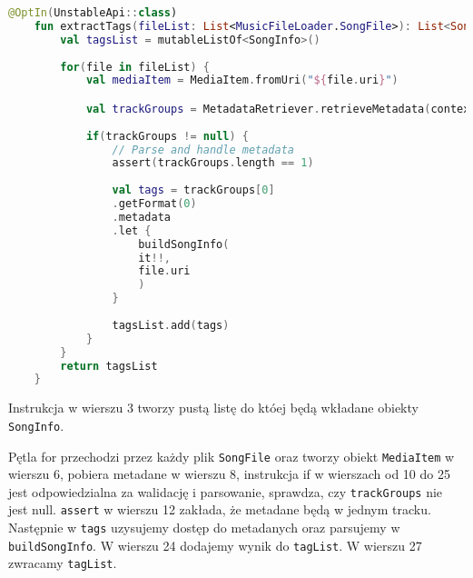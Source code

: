 \begin{lstlisting}[caption=Metoda \texttt{TagExtractor()}, label={lst:Tag-tagextractor}, language=kotlin]
	@OptIn(UnstableApi::class)
	fun extractTags(fileList: List<MusicFileLoader.SongFile>): List<SongInfo> {
		val tagsList = mutableListOf<SongInfo>()
		
		for(file in fileList) {
			val mediaItem = MediaItem.fromUri("${file.uri}")

			val trackGroups = MetadataRetriever.retrieveMetadata(context, mediaItem).get()
			
			if(trackGroups != null) {
				// Parse and handle metadata
				assert(trackGroups.length == 1)
				
				val tags = trackGroups[0]
				.getFormat(0)
				.metadata
				.let {
					buildSongInfo(
					it!!,
					file.uri
					)
				}
				
				tagsList.add(tags)
			}
		}
		return tagsList
	}
\end{lstlisting}
Instrukcja w wierszu 3 tworzy pustą listę do któej będą wkładane obiekty \texttt{SongInfo}.

Pętla for przechodzi przez każdy plik \texttt{SongFile} oraz tworzy obiekt \texttt{MediaItem} w wierszu 6, pobiera metadane w wierszu 8, instrukcja if w wierszach od 10 do 25 jest odpowiedzialna za walidację i parsowanie, sprawdza, czy \texttt{trackGroups} nie jest null. \texttt{assert} w wierszu 12 zakłada, że metadane będą w jednym tracku. Następnie w \texttt{tags} uzysujemy dostęp do metadanych oraz parsujemy w \texttt{buildSongInfo}.
W wierszu 24 dodajemy wynik do \texttt{tagList}.
W wierszu 27 zwracamy \texttt{tagList}.